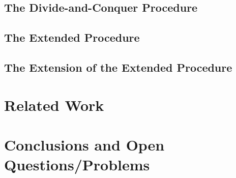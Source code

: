 \subsection{The Divide-and-Conquer Procedure}
\newpage
\subsection{The Extended Procedure}
\newpage
\subsection{The Extension of the Extended Procedure}
\newpage
\section{Related Work}
\pagebreak

\section{Conclusions and Open Questions/Problems}
\pagebreak






